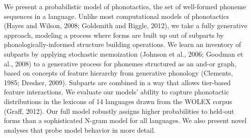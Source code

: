We present a probabilistic model of phonotactics, the set of well-formed phoneme sequences in a language. Unlike most computational models of phonotactics (Hayes and Wilson, 2008; Goldsmith and Riggle, 2012), we take a fully generative approach, modeling a process where forms are built up out of subparts by phonologically-informed structure building operations. We learn an inventory of subparts by applying stochastic memoization (Johnson et al., 2006; Goodman et al., 2008) to a generative process for phonemes structured as an and-or graph, based on concepts of feature hierarchy from generative phonology (Clements, 1985; Dresher, 2009). Subparts are combined in a way that allows tier-based feature interactions. We evaluate our models’ ability to capture phonotactic distributions in the lexicons of 14 languages drawn from the WOLEX corpus (Graff, 2012). Our full model robustly assigns higher probabilities to held-out forms than a sophisticated N-gram model for all languages. We also present novel analyses that probe model behavior in more detail.